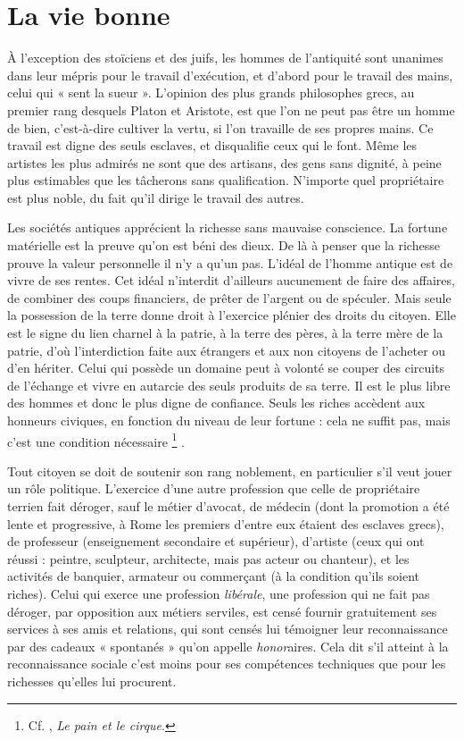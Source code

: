 \section{La vie bonne}

 À l'exception des stoïciens et des juifs, les hommes de l'antiquité sont unanimes dans leur mépris pour le travail d'exécution, et d'abord pour le travail des mains, celui qui « sent la sueur ». L'opinion des plus grands philosophes grecs, au premier rang desquels Platon et Aristote, est que l'on ne peut pas être un homme de bien, c'est-à-dire cultiver la vertu, si l'on travaille de ses propres mains. Ce travail est digne des seuls esclaves, et disqualifie ceux qui le font. Même les artistes les plus admirés ne sont que des artisans, des gens sans dignité, à peine plus estimables que les tâcherons sans qualification. N'importe quel propriétaire est plus noble, du fait qu'il dirige le travail des autres.

 Les sociétés antiques apprécient la richesse sans mauvaise conscience. La fortune matérielle est la preuve qu'on est béni des dieux. De là à penser que la richesse prouve la valeur personnelle il n'y a qu'un pas. L'idéal de l'homme antique est de vivre de ses rentes. Cet idéal n'interdit d'ailleurs aucunement de faire des affaires, de combiner des coups financiers, de prêter de l'argent ou de spéculer. Mais seule la possession de la terre donne droit à l'exercice plénier des droits du citoyen. Elle est le signe du lien charnel à la patrie, à la terre des pères, à la terre mère de la patrie, d'où l'interdiction faite aux étrangers et aux non citoyens de l'acheter ou d'en hériter. Celui qui possède un domaine peut à volonté se couper des circuits de l'échange et vivre en autarcie des seuls produits de sa terre. Il est le plus libre des hommes et donc le plus digne de confiance. Seuls les riches accèdent aux honneurs civiques, en fonction du niveau de leur fortune : cela ne suffit pas, mais c'est une condition nécessaire%
\footnote{Cf. , \emph{Le pain et le cirque}.}%
.

 Tout citoyen se doit de soutenir son rang noblement, en particulier s'il veut jouer un rôle politique. L'exercice d'une autre profession que celle de propriétaire terrien fait déroger, sauf le métier d'avocat, de médecin (dont la promotion a été lente et progressive, à Rome les premiers d'entre eux étaient des esclaves grecs), de professeur (enseignement secondaire et supérieur), d'artiste (ceux qui ont réussi : peintre, sculpteur, architecte, mais pas acteur ou chanteur), et les activités de banquier, armateur ou commerçant (à la condition qu'ils soient riches). Celui qui exerce une profession \emph{libérale}, une profession qui ne fait pas déroger, par opposition aux métiers serviles, est censé fournir gratuitement ses services à ses amis et relations, qui sont censés lui témoigner leur reconnaissance par des cadeaux « spontanés » qu'on appelle \emph{honor}aires. Cela dit s'il atteint à la reconnaissance sociale c'est moins pour ses compétences techniques que pour les richesses qu'elles lui procurent. 

